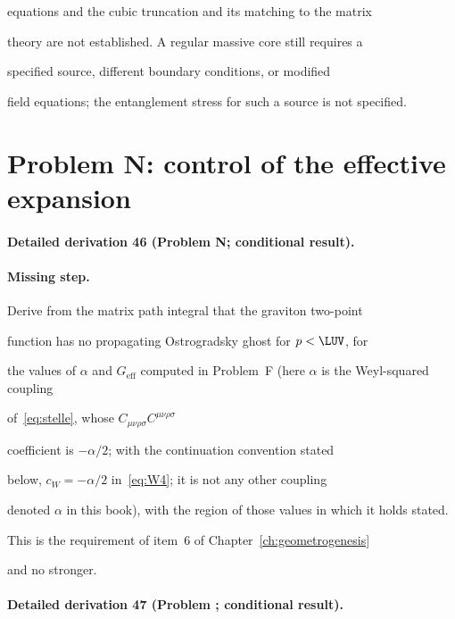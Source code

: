equations and the cubic truncation and its matching to the matrix

theory are not established. A regular massive core still requires a

specified source, different boundary conditions, or modified

field equations; the entanglement stress for such a source is not specified.



\section{Problem N: control of the effective expansion}

\label{sec:status-N}



\paragraph{Detailed derivation 46 (Problem N; conditional result).} \label{ref:detail-45} %



\paragraph{Missing step.}

Derive from the matrix path integral that the graviton two-point

function has no propagating Ostrogradsky ghost for \(p<\LUV\), for

the values of \(\alpha\) and \(G_{\mathrm{eff}}\) computed in Problem~F (here \(\alpha\) is the Weyl-squared coupling

of~\eqref{eq:stelle}, whose \(C_{\mu\nu\rho\sigma}C^{\mu\nu\rho\sigma}\)

coefficient is \(-\alpha/2\); with the continuation convention stated

below, \(c_W=-\alpha/2\) in~\eqref{eq:W4}; it is not any other coupling

denoted \(\alpha\) in this book), with the region of those values in which it holds stated.

This is the requirement of item~6 of Chapter~\ref{ch:geometrogenesis}

and no stronger.



\paragraph{Detailed derivation 47 (Problem ; conditional result).} \label{ref:detail-46} %



